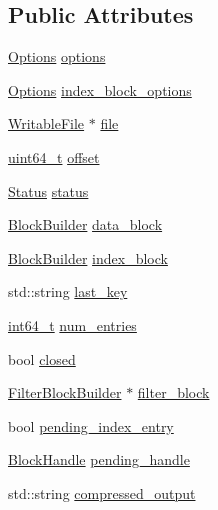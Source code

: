 \subsection*{Public Attributes}
\begin{DoxyCompactItemize}
\item 
\hyperlink{structleveldb_1_1_options}{Options} \hyperlink{structleveldb_1_1_table_builder_1_1_rep_a0ca1914136ea4c451b026b4f1913fe36}{options}
\item 
\hyperlink{structleveldb_1_1_options}{Options} \hyperlink{structleveldb_1_1_table_builder_1_1_rep_a3ae22fe880ca1b98c3a7e24c1ec72c98}{index\-\_\-block\-\_\-options}
\item 
\hyperlink{classleveldb_1_1_writable_file}{Writable\-File} $\ast$ \hyperlink{structleveldb_1_1_table_builder_1_1_rep_a3c33014db181b382785784cf0864f92b}{file}
\item 
\hyperlink{stdint_8h_aaa5d1cd013383c889537491c3cfd9aad}{uint64\-\_\-t} \hyperlink{structleveldb_1_1_table_builder_1_1_rep_a308abc45d45b23d05a0764f6fc501c40}{offset}
\item 
\hyperlink{classleveldb_1_1_status}{Status} \hyperlink{structleveldb_1_1_table_builder_1_1_rep_a8345f0a97587121457fb180a1fb081dd}{status}
\item 
\hyperlink{classleveldb_1_1_block_builder}{Block\-Builder} \hyperlink{structleveldb_1_1_table_builder_1_1_rep_a6bef8b1271d88ec2d38aa7a0f9ae8a24}{data\-\_\-block}
\item 
\hyperlink{classleveldb_1_1_block_builder}{Block\-Builder} \hyperlink{structleveldb_1_1_table_builder_1_1_rep_a7d5740122ca84239cb009d513cf14681}{index\-\_\-block}
\item 
std\-::string \hyperlink{structleveldb_1_1_table_builder_1_1_rep_a5a071831c7e42011a40b04cb60cdfa09}{last\-\_\-key}
\item 
\hyperlink{stdint_8h_adec1df1b8b51cb32b77e5b86fff46471}{int64\-\_\-t} \hyperlink{structleveldb_1_1_table_builder_1_1_rep_a89f93baffb3ca5c8239796dc1a57777a}{num\-\_\-entries}
\item 
bool \hyperlink{structleveldb_1_1_table_builder_1_1_rep_a5324550d58b999bcea173b1c21060138}{closed}
\item 
\hyperlink{classleveldb_1_1_filter_block_builder}{Filter\-Block\-Builder} $\ast$ \hyperlink{structleveldb_1_1_table_builder_1_1_rep_aad1620ca746b7287a819880be083ec6b}{filter\-\_\-block}
\item 
bool \hyperlink{structleveldb_1_1_table_builder_1_1_rep_a56e14221a2e29941a37d208f99770c20}{pending\-\_\-index\-\_\-entry}
\item 
\hyperlink{classleveldb_1_1_block_handle}{Block\-Handle} \hyperlink{structleveldb_1_1_table_builder_1_1_rep_abf3b47f6f2b7407399c7134ac65f7225}{pending\-\_\-handle}
\item 
std\-::string \hyperlink{structleveldb_1_1_table_builder_1_1_rep_ae299e513afc71a8474c303b25aaadb08}{compressed\-\_\-output}
\end{DoxyCompactItemize}


